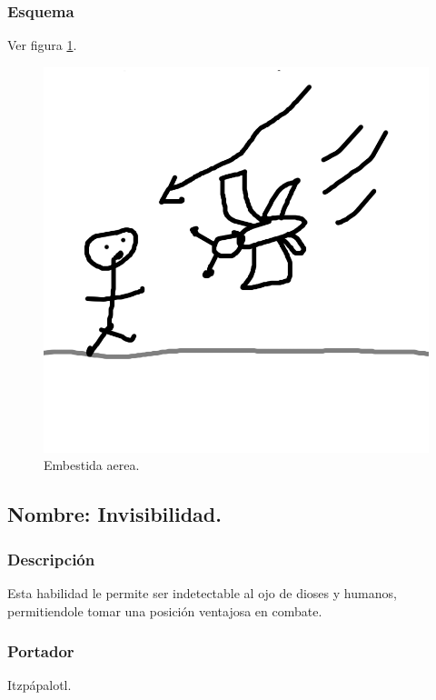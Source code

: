 \documentclass[11pt,letterpaper]{article}
\begin{document}
\subsubsection{Esquema}
			Ver figura \ref{fig:embestidaA}.
			\begin{figure}
				\centering
				\includegraphics[height=0.2 \textheight]{Imagenes/embestidaA}
				\caption{Embestida aerea.}
				\label{fig:embestidaA}
			\end{figure}
\subsection{Nombre: Invisibilidad.}
\subsubsection{Descripción}
Esta habilidad le permite ser indetectable al ojo de dioses y humanos, permitiendole tomar una posición ventajosa en combate.
\subsubsection{Portador}
Itzpápalotl.
\end{document}

